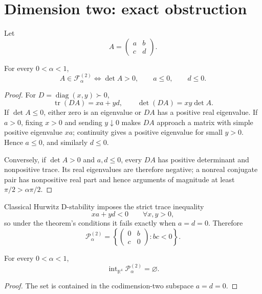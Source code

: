\section{Dimension two: exact obstruction}
\label{sec:dimension-two}

Let
\[
A=\begin{pmatrix}a&b\\c&d\end{pmatrix}.
\]

\begin{theorem}
\label{thm:2x2}
For every \(0<\alpha<1\),
\[
A\in\mathcal F_\alpha^{(2)}
\iff
\det A>0,\qquad a\le0,\qquad d\le0.
\]
\end{theorem}

\begin{proof}
For \(D=\operatorname{diag}(x,y)\succ0\),
\[
\operatorname{tr}(DA)=xa+yd,
\qquad
\det(DA)=xy\det A.
\]
If \(\det A\le0\), either zero is an eigenvalue or \(DA\) has a positive real eigenvalue. If \(a>0\), fixing \(x>0\) and sending \(y\downarrow0\) makes \(DA\) approach a matrix with simple positive eigenvalue \(xa\); continuity gives a positive eigenvalue for small \(y>0\). Hence \(a\le0\), and similarly \(d\le0\).

Conversely, if \(\det A>0\) and \(a,d\le0\), every \(DA\) has positive determinant and nonpositive trace. Its real eigenvalues are therefore negative; a nonreal conjugate pair has nonpositive real part and hence arguments of magnitude at least \(\pi/2>\alpha\pi/2\).
\end{proof}

Classical Hurwitz D-stability imposes the strict trace inequality
\[
xa+yd<0
\qquad
\forall x,y>0,
\]
so under the theorem's conditions it fails exactly when \(a=d=0\). Therefore
\[
\mathcal P_\alpha^{(2)}
=
\left\{
\begin{pmatrix}0&b\\c&0\end{pmatrix}:bc<0
\right\}.
\]

\begin{corollary}
\label{cor:2x2-empty-interior}
For every \(0<\alpha<1\),
\[
\operatorname{int}_{\mathbb R^4}\mathcal P_\alpha^{(2)}
=
\varnothing.
\]
\end{corollary}

\begin{proof}
The set is contained in the codimension-two subspace \(a=d=0\).
\end{proof}
